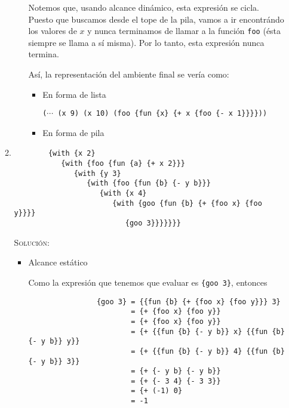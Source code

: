 \documentclass[letterpaper,11pt]{article}
\begin{document}
\begin{enumerate}
\begin{enumerate}
\begin{itemize}
            Notemos que, usando alcance dinámico, esta expresión se cicla.
            Puesto que buscamos desde el tope de la pila, vamos a ir encontrándo
            los valores de $x$ y nunca terminamos de llamar a la función 
            \texttt{foo} (ésta siempre se llama a sí misma). Por lo tanto, esta 
            expresión nunca termina.
            
            Así, la representación del ambiente final se vería como:
            \begin{itemize}
                \item En forma de lista
                \begin{center}
                    \texttt{($\cdots$ (x 9) (x 10) 
                            (foo \{fun \{x\} \{+ x \{foo \{- x 1\}\}\}\}))}
                \end{center}

                \newpage
                \item En forma de pila 
                \begin{center}
                \begin{drawstack}[scale=1.78]
                    \bcell{$\vdots$}
                \end{drawstack}
                \end{center}
            \end{itemize}
        \end{itemize}
        
        \item 
        \begin{verbatim}
        {with {x 2} 
           {with {foo {fun {a} {+ x 2}}} 
              {with {y 3} 
                 {with {foo {fun {b} {- y b}}} 
                    {with {x 4} 
                       {with {goo {fun {b} {+ {foo x} {foo y}}}} 
                          {goo 3}}}}}}}
        \end{verbatim}
        
        \textsc{Solución:}
        \begin{itemize}
            \item Alcance estático
            
            Como la expresión que tenemos que evaluar es \texttt{\{goo 3\}}, 
            entonces 
            \begin{verbatim}
                {goo 3} = {{fun {b} {+ {foo x} {foo y}}} 3}
                        = {+ {foo x} {foo y}}
                        = {+ {foo x} {foo y}}
                        = {+ {{fun {b} {- y b}} x} {{fun {b} {- y b}} y}}
                        = {+ {{fun {b} {- y b}} 4} {{fun {b} {- y b}} 3}}
                        = {+ {- y b} {- y b}}
                        = {+ {- 3 4} {- 3 3}}
                        = {+ (-1) 0}
                        = -1
            \end{verbatim}


\end{itemize}
\end{enumerate}
\end{enumerate}
\end{document}
